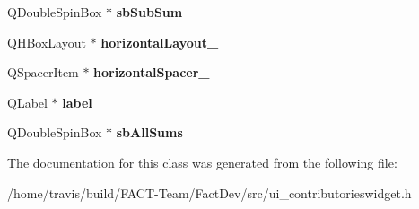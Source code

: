 \begin{DoxyCompactItemize}
\item 
\hypertarget{classUi__ContributoriesWidget_a7d8e3d30cc335b461414932e68f39b38}{Q\-Double\-Spin\-Box $\ast$ {\bfseries sb\-Sub\-Sum}}\label{classUi__ContributoriesWidget_a7d8e3d30cc335b461414932e68f39b38}

\item 
\hypertarget{classUi__ContributoriesWidget_ab5a4f6bb01854780ae5e277bae6204b1}{Q\-H\-Box\-Layout $\ast$ {\bfseries horizontal\-Layout\-\_}}\label{classUi__ContributoriesWidget_ab5a4f6bb01854780ae5e277bae6204b1}

\item 
\hypertarget{classUi__ContributoriesWidget_aaf04e1590e80db81b7e9b136c8a2167c}{Q\-Spacer\-Item $\ast$ {\bfseries horizontal\-Spacer\-\_}}\label{classUi__ContributoriesWidget_aaf04e1590e80db81b7e9b136c8a2167c}

\item 
\hypertarget{classUi__ContributoriesWidget_a7f43b63228920e66c5199aa828c8a88f}{Q\-Label $\ast$ {\bfseries label}}\label{classUi__ContributoriesWidget_a7f43b63228920e66c5199aa828c8a88f}

\item 
\hypertarget{classUi__ContributoriesWidget_ad64addd4225c398a66e6497044da39ef}{Q\-Double\-Spin\-Box $\ast$ {\bfseries sb\-All\-Sums}}\label{classUi__ContributoriesWidget_ad64addd4225c398a66e6497044da39ef}

\end{DoxyCompactItemize}


The documentation for this class was generated from the following file\-:\begin{DoxyCompactItemize}
\item 
/home/travis/build/\-F\-A\-C\-T-\/\-Team/\-Fact\-Dev/src/ui\-\_\-contributorieswidget.\-h\end{DoxyCompactItemize}
